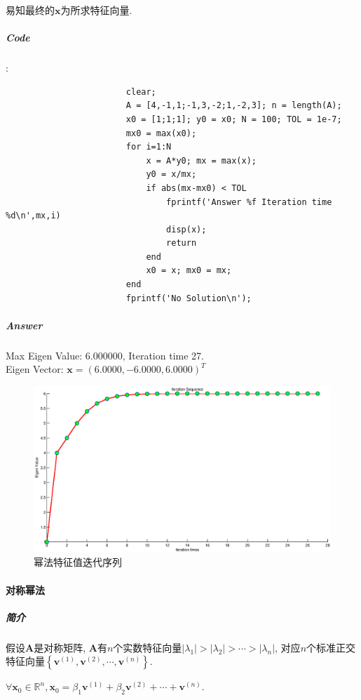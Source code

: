 \documentclass{article}
\begin{document}
\begin{CJK*}{UTF8}{song}
					易知最终的$\mathbf{x}$为所求特征向量.
				\subparagraph{Code} :\newline
					\begin{lstlisting}
						clear;
						A = [4,-1,1;-1,3,-2;1,-2,3]; n = length(A);
						x0 = [1;1;1]; y0 = x0; N = 100; TOL = 1e-7;
						mx0 = max(x0);
						for i=1:N
							x = A*y0; mx = max(x);
							y0 = x/mx;
							if abs(mx-mx0) < TOL
								fprintf('Answer %f Iteration time %d\n',mx,i)
								disp(x);
								return
							end
							x0 = x; mx0 = mx;
						end
						fprintf('No Solution\n');
					\end{lstlisting}
				\subparagraph{Answer}
					Max Eigen Value: 6.000000, Iteration time 27.\\
					Eigen Vector: $\mathbf{x} = \left(6.0000,-6.0000,6.0000 \right)^T$
					\begin{figure}[H]
						\centering
						\includegraphics[width=1.0\textwidth]{../chapter_9_1.eps}
						\caption{幂法特征值迭代序列}
						\label{img_chapter9_1}
					\end{figure}
			\paragraph{对称幂法}
				\subparagraph{简介}
					假设$\mathbf{A}$是对称矩阵, $\mathbf{A}$有$n$个实数特征向量$\left|\lambda_1 \right| > \left|\lambda_2 \right| > \cdots > \left|\lambda_n \right|$, 对应$n$个标准正交特征向量$\left\{\mathbf{v}^{\left(1\right)}, \mathbf{v}^{\left(2\right)}, \cdots, \mathbf{v}^{\left(n\right)} \right\}$. 
					
					$\forall \mathbf{x}_0 \in \mathbb{R}^{n}, \mathbf{x}_0 = \beta_1 \mathbf{v}^{\left(1\right)} + \beta_2 \mathbf{v}^{\left(2\right)} + \cdots + \mathbf{v}^{\left(n\right)}$.
					

\end{CJK*}
\end{document}
